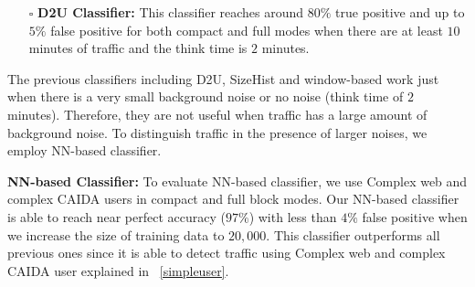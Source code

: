 \begin{compactitem}
\begin{itemize}
\item[$\square$] \textbf{D2U Classifier:}
This classifier reaches around $80\%$ true positive and up to $5\%$ false positive for both compact and full modes when there are at least $10$ minutes of traffic and the think time is $2$ minutes. 
\end{itemize}
\iffalse
\item[$\square$] \textbf{SizeTor Classifier:}
We use this method when the traffic is tunneled over Tor (three pluggable transports and normal Tor).
We reach perfect more than $90\%$ true positive and $0\%$ false positive when we have one tab 
open with zero think time. We increase the noise to see when the results start dropping. 
We learn that increasing the background noise to more than one open tab hugely impacts 
the performance: with two open tabs and $10$ minutes of traffic, we have $40\%$ true positive.
\end{itemize}
\fi
The previous classifiers including D2U, SizeHist and window-based work just when there is a very small background noise or no noise (think time of $2$ minutes). Therefore, they are not useful when \bc traffic has a large amount of background noise. To distinguish \bc traffic in the presence of larger noises, we employ NN-based classifier.
\item \textbf{NN-based Classifier:}
To evaluate NN-based classifier, we use Complex web and complex CAIDA users in compact and full block modes. Our NN-based classifier is able to reach near perfect accuracy ($97\%$) with less than $4\%$ false positive when we increase the size of training data to $20,000$. This classifier outperforms all previous ones since it is able to detect \bc traffic using Complex web and complex CAIDA user explained in ~\ref{simpleuser}.
\end{compactitem}

